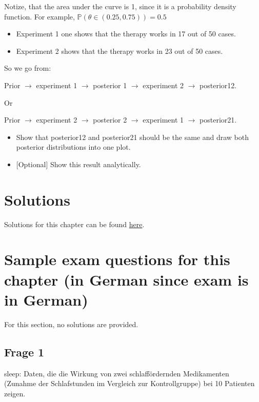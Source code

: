 \documentclass[
]{book}
\providecommand{\tightlist}{%
  \setlength{\itemsep}{0pt}\setlength{\parskip}{0pt}}
\begin{document}
Notize, that the area under the curve is 1, since it is a probability density function.
For example, \(\mathbb{P}(\theta \in (0.25,0.75)) = 0.5\)

\begin{itemize}
\tightlist
\item
  Experiment 1 one shows that the therapy works in 17 out of 50 cases.
\item
  Experiment 2 shows that the therapy works in 23 out of 50 cases.
\end{itemize}

So we go from:

Prior \(\rightarrow\) experiment 1 \(\rightarrow\) posterior 1 \(\rightarrow\) experiment 2 \(\rightarrow\) posterior12.

Or

Prior \(\rightarrow\) experiment 2 \(\rightarrow\) posterior 2 \(\rightarrow\) experiment 1 \(\rightarrow\) posterior21.

\begin{itemize}
\item
  Show that posterior12 and posterior21 should be the same and draw both posterior distributions into one plot.
\item
  {[}Optional{]} Show this result analytically.
\end{itemize}

\section{Solutions}\label{solutions-2}

Solutions for this chapter can be found \href{https://github.com/jdegenfellner/Script_QM1_ZHAW/tree/main/Solutions_to_Exercises/4_Bayes_Statistics}{here}.

\section{Sample exam questions for this chapter (in German since exam is in German)}\label{sample-exam-questions-for-this-chapter-in-german-since-exam-is-in-german-2}

For this section, no solutions are provided.

\subsection{Frage 1}\label{frage-1}

sleep: Daten, die die Wirkung von zwei schlaffördernden Medikamenten
(Zunahme der Schlafstunden im Vergleich zur Kontrollgruppe) bei 10 Patienten zeigen.
\end{document}
